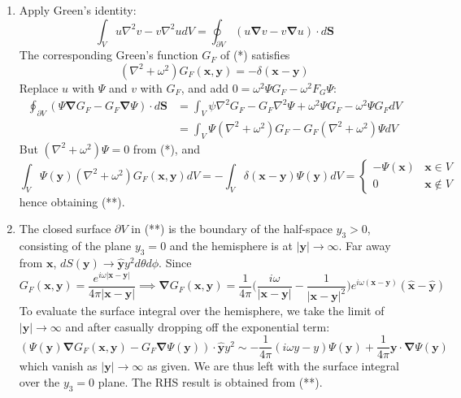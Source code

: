 \documentclass[a4paper]{article}
\begin{document}
\begin{ans}\leavevmode
\begin{enumerate}[label=(\roman*)]
\item Apply Green's identity:
$$\int_Vu\nabla^2v-v\nabla^2udV=\oint_{\partial V}(u\boldsymbol{\nabla}v-v\boldsymbol{\nabla}u)\cdot d\mathbf{S}$$
The corresponding Green's function $G_F$ of (*) satisfies
$$(\nabla^2+\omega^2)G_F(\mathbf{x},\mathbf{y})=-\delta(\mathbf{x}-\mathbf{y})$$
Replace $u$ with $\Psi$ and $v$ with $G_F$, and add $0=\omega^2\Psi G_F-\omega^2F_G\Psi$:
\begin{align}
\oint_{\partial V}(\Psi\boldsymbol{\nabla}G_F-G_F\boldsymbol{\nabla}\Psi)\cdot d\mathbf{S}&=\int_V\psi\nabla^2G_F-G_F\nabla^2\Psi+\omega^2\Psi G_F-\omega^2\Psi G_FdV\nonumber\\&=\int_V\Psi(\nabla^2+\omega^2)G_F-G_F(\nabla^2+\omega^2)\Psi dV\nonumber
\end{align}
But $(\nabla^2+\omega^2)\Psi=0$ from (*), and 
\begin{equation}
    \int_V\Psi(\mathbf{y})(\nabla^2+\omega^2)G_F(\mathbf{x},\mathbf{y})dV=-\int_V\delta(\mathbf{x}-\mathbf{y})\Psi(\mathbf{y})dV=
\left\{
        \begin{array}{ll}
      -\Psi(\mathbf{x}) & \mathbf{x}\in V \\
      0 & \mathbf{x}\notin V
        \end{array}
    \right.\nonumber
\end{equation}
hence obtaining (**).
\item The closed surface $\partial V$ in (**) is the boundary of the half-space $y_3>0$, consisting of the plane $y_3=0$ and the hemisphere is at $|\mathbf{y}|\rightarrow\infty$. Far away from $\mathbf{x}$, $dS(\mathbf{y})\rightarrow\mathbf{\hat{y}}y^2d\theta d\phi$. Since $$G_F(\mathbf{x},\mathbf{y})=\frac{e^{i\omega|\mathbf{x}-\mathbf{y}|}}{4\pi|\mathbf{x}-\mathbf{y}|}\implies\boldsymbol{\nabla}G_F(\mathbf{x},\mathbf{y})=\frac{1}{4\pi}\bigg(\frac{i\omega}{|\mathbf{x}-\mathbf{y}|}-\frac{1}{|\mathbf{x}-\mathbf{y}|^2}\bigg)e^{i\omega(\mathbf{x}-\mathbf{y})}(\mathbf{\hat{x}}-\mathbf{\hat{y}})$$
To evaluate the surface integral over the hemisphere, we take the limit of $|\mathbf{y}|\rightarrow\infty$ and after casually dropping off the exponential term: 
$$(\Psi(\mathbf{y})\boldsymbol{\nabla}G_F(\mathbf{x},\mathbf{y})-G_F\boldsymbol{\nabla}\Psi(\mathbf{y}))\cdot\mathbf{\hat{y}}y^2\sim-\frac{1}{4\pi}(i\omega y-y)\Psi(\mathbf{y})+\frac{1}{4\pi}\mathbf{y}\cdot\boldsymbol{\nabla}\Psi(\mathbf{y})$$
which vanish as $|\mathbf{y}|\rightarrow\infty$ as given. We are thus left with the surface integral over the $y_3=0$ plane. The RHS result is obtained from (**).

\end{enumerate}
\end{ans}
\end{document}
